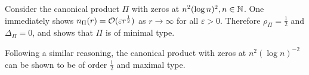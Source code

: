 \begin{samepage}    
\begin{example}
    Consider the canonical product $\Pi$ with zeros at $ n^2 (\log n)^2, n \in \mathbb{N} $. One immediately shows $n_\Pi(r) = \mathcal{O}(\varepsilon r^\frac{1}{2})$ as $r \to \infty$ for all $\varepsilon > 0$. Therefore $\rho_\Pi = \frac{1}{2}$ and $\Delta_\Pi = 0$, and  shows that $\Pi$ is of minimal type.

    Following a similar reasoning, the canonical product with zeros at $ n^2 (\log n)^{-2} $ can be shown to be of order $\frac{1}{2}$ and maximal type.
\end{example}
\end{samepage}